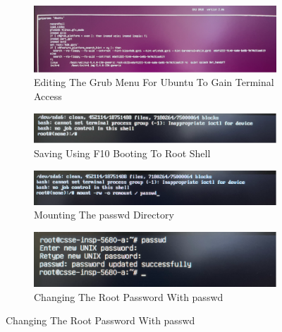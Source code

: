 \documentclass[manuscript,acmsmall,anonymous,review,screen,nonacm=true, authorversion=true]{acmart}
\begin{document}
\begin{figure}
    \centering
   \begin{subfigure}{.7\textwidth}
    \begin{centering}
    \includegraphics[scale=0.5]{pict/Picture7.png}
    \caption{Editing The Grub Menu For Ubuntu To Gain Terminal Access}
    \end{centering}
\end{subfigure}
\begin{subfigure}{.7\textwidth}
    \begin{centering}
    \includegraphics[scale=0.5]{pict/Picture8.png}
    \caption{Saving Using F10 Booting To Root Shell}
    \end{centering}
\end{subfigure}
\begin{subfigure}{.7\textwidth}
    \begin{centering}
    \includegraphics[scale=0.5]{pict/Picture9.png}
    \caption{Mounting The passwd Directory}
    \end{centering}
\end{subfigure}
\begin{subfigure}{.45\textwidth}
    \begin{centering}
    \includegraphics[scale=0.5]{pict/Picture10.png}
    \caption{Changing The Root Password With passwd}
    \end{centering}

\end{subfigure}
\end{figure}
\end{document}
